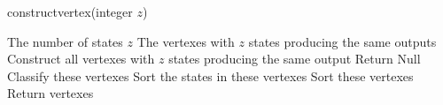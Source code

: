 \begin{algorithm}[h!]
\caption{{\sf constructvertex}(integer $z$)}
\begin{algorithmic}[1]
\REQUIRE 
The number of states $z$
\ENSURE  
The vertexes with $z$ states producing the same outputs 
\STATE  Construct all vertexes with $z$ states producing the same output 
\STATE  Return Null
\ELSE 
\STATE  Classify these vertexes
\STATE Sort the states in these vertexes
\STATE Sort these vertexes
\STATE Return vertexes
\ENDIF 
\end{algorithmic}
 \label{alg:2}
\end{algorithm}



